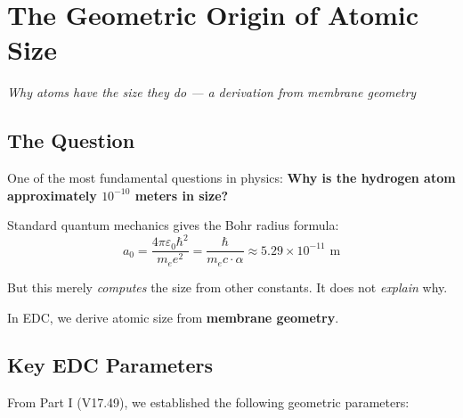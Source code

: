 % 

\section{The Geometric Origin of Atomic Size}
\label{sec:bohr_radius_derivation}

\begin{center}
\textit{Why atoms have the size they do --- a derivation from membrane geometry}
\end{center}

\vspace{1em}

\subsection{The Question}

One of the most fundamental questions in physics: \textbf{Why is the hydrogen atom approximately $10^{-10}$ meters in size?}

Standard quantum mechanics gives the Bohr radius formula:
\begin{equation}
a_0 = \frac{4\pi\varepsilon_0 \hbar^2}{m_e e^2} = \frac{\hbar}{m_e c \cdot \alpha} \approx 5.29 \times 10^{-11} \text{ m}
\label{eq:bohr_standard}
\end{equation}

But this merely \textit{computes} the size from other constants. It does not \textit{explain} why.

In EDC, we derive atomic size from \textbf{membrane geometry}.

\subsection{Key EDC Parameters}
\label{subsec:edc_parameters}

From Part I (V17.49), we established the following geometric parameters:

